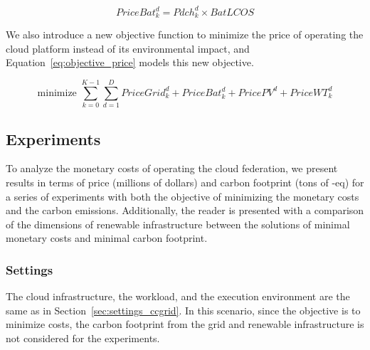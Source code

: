 \begin{equation} \label{eq:pricebat}
   PriceBat^d_k = Pdch^d_k \times BatLCOS
\end{equation}


We also introduce a new objective function to minimize the price of operating the cloud platform instead of its environmental impact, and Equation~\eqref{eq:objective_price} models this new objective.
  
\begin{equation} \label{eq:objective_price}
\text{minimize }\sum_{k=0}^{K-1} \sum_{d=1}^D PriceGrid^d_k  + PriceBat^d_k + PricePV^d+ PriceWT^d_k
\end{equation}


\subsection{Experiments}

To analyze the monetary costs of operating the cloud federation, we present results in terms of price (millions of dollars) and carbon footprint (tons of -eq) for a series of experiments with both the objective of minimizing the monetary costs and the carbon emissions. Additionally, the reader is presented with a comparison of the dimensions of renewable infrastructure between the solutions of minimal monetary costs and minimal carbon footprint.

\subsubsection{Settings}

The cloud infrastructure, the workload, and the execution environment are the same as in Section~\ref{sec:settings_ccgrid}. In this scenario, since the objective is to minimize costs, the carbon footprint from the grid and renewable infrastructure is not considered for the experiments.

